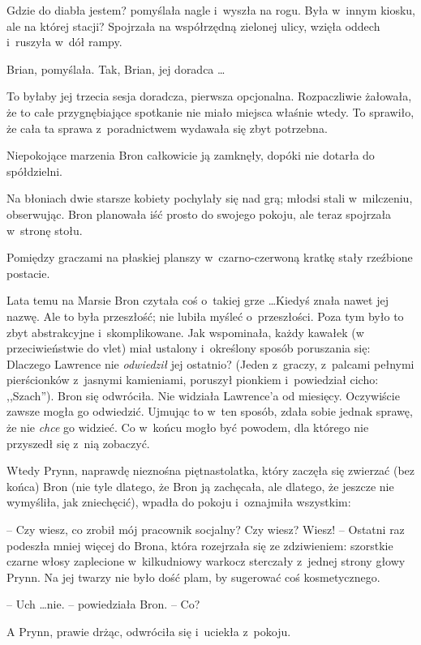 \documentclass[oneside,polish,11pt,rmheadings]{mwbk}
\begin{document}
Gdzie do diabła jestem? pomyślała nagle i~wyszła na rogu. Była w~innym kiosku, ale na której stacji? Spojrzała na współrzędną zielonej ulicy, wzięła oddech i~ruszyła w~dół rampy. 

Brian, pomyślała. Tak, Brian, jej doradca \ldots  

To byłaby jej trzecia sesja doradcza, pierwsza  opcjonalna. Rozpaczliwie żałowała, że to całe przygnębiające spotkanie nie miało miejsca właśnie wtedy. To sprawiło, że cała ta sprawa z~poradnictwem wydawała się zbyt potrzebna. 

Niepokojące marzenia Bron całkowicie ją zamknęły, dopóki nie dotarła do spółdzielni. 

Na błoniach dwie starsze kobiety pochylały się nad grą; młodsi stali w~milczeniu, obserwując. Bron planowała iść prosto do swojego pokoju, ale teraz spojrzała w~stronę stołu. 

Pomiędzy graczami na płaskiej planszy w~czarno-czerwoną kratkę stały rzeźbione postacie. 

Lata temu na Marsie Bron czytała coś o~takiej grze \ldots   Kiedyś znała nawet jej nazwę. Ale to była przeszłość; nie lubiła myśleć o~przeszłości. Poza tym było to zbyt abstrakcyjne i~skomplikowane. Jak wspominała, każdy kawałek (w przeciwieństwie do vlet) miał ustalony i~określony sposób poruszania się: Dlaczego Lawrence nie \textit{odwiedził }jej ostatnio? (Jeden z~graczy, z~palcami pełnymi pierścionków z~jasnymi kamieniami, poruszył pionkiem i~powiedział cicho: ,,Szach''). Bron się odwróciła. Nie widziała Lawrence'a od miesięcy. Oczywiście zawsze mogła go odwiedzić. Ujmując to w~ten sposób, zdała sobie jednak sprawę, że nie \textit{chce }go widzieć. Co w~końcu mogło być powodem, dla którego nie przyszedł się z~nią zobaczyć. 

Wtedy Prynn, naprawdę nieznośna piętnastolatka, który zaczęła się zwierzać (bez końca) Bron (nie tyle dlatego, że Bron ją zachęcała, ale dlatego, że jeszcze nie wymyśliła, jak zniechęcić), wpadła do pokoju i~oznajmiła wszystkim: 

-- Czy wiesz, co zrobił mój pracownik socjalny? Czy wiesz? Wiesz!  --  Ostatni raz podeszła mniej więcej do Brona, która rozejrzała się ze zdziwieniem: szorstkie czarne włosy zaplecione w~kilkudniowy warkocz sterczały z~jednej strony głowy Prynn. Na jej twarzy nie było dość plam, by sugerować coś kosmetycznego. 

-- Uch \ldots  nie. -- powiedziała Bron. -- Co? 

A Prynn, prawie drżąc, odwróciła się i~uciekła z~pokoju. 
\end{document}
